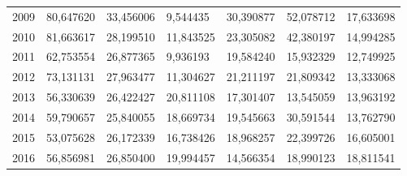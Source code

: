 \begin{table}
\begin{tabular}{p{1cm}p{2cm}p{2cm}p{2cm}p{2cm}p{2cm}p{2cm}}
 2009 &       80,647620 &                                   33,456006 &                           9,544435 &                           30,390877 &                             52,078712 &         17,633698 \\
 2010 &       81,663617 &                                   28,199510 &                          11,843525 &                           23,305082 &                             42,380197 &         14,994285 \\
 2011 &       62,753554 &                                   26,877365 &                           9,936193 &                           19,584240 &                             15,932329 &         12,749925 \\
 2012 &       73,131131 &                                   27,963477 &                          11,304627 &                           21,211197 &                             21,809342 &         13,333068 \\
 2013 &       56,330639 &                                   26,422427 &                          20,811108 &                           17,301407 &                             13,545059 &         13,963192 \\
 2014 &       59,790657 &                                   25,840055 &                          18,669734 &                           19,545663 &                             30,591544 &         13,762790 \\
 2015 &       53,075628 &                                   26,172339 &                          16,738426 &                           18,968257 &                             22,399726 &         16,605001 \\
 2016 &       56,856981 &                                   26,850400 &                          19,994457 &                           14,566354 &                             18,990123 &         18,811541 \\
\bottomrule
\end{tabular}
\end{table}
